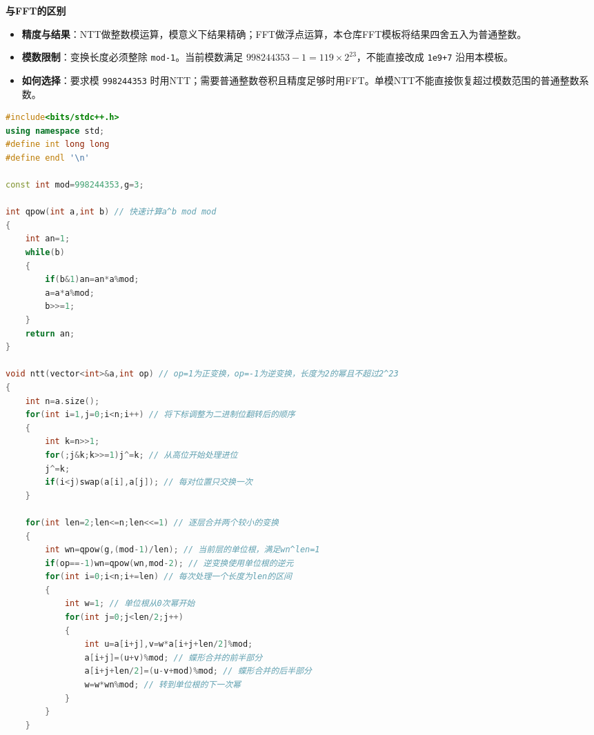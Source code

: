 \documentclass[10pt,landscape,a4paper]{article}
\begin{document}
\begin{multicols*}{3}
\par\addvspace{0.7ex}\noindent\textbf{与FFT的区别}\par\nobreak
\begin{itemize}
\item \textbf{精度与结果}：NTT做整数模运算，模意义下结果精确；FFT做浮点运算，本仓库FFT模板将结果四舍五入为普通整数。
\item \textbf{模数限制}：变换长度必须整除 \texttt{m\allowbreak{}o\allowbreak{}d\allowbreak{}-\allowbreak{}1}。当前模数满足 $998244353-1=119\times2^{23}$，不能直接改成 \texttt{1\allowbreak{}e\allowbreak{}9\allowbreak{}+\allowbreak{}7} 沿用本模板。
\item \textbf{如何选择}：要求模 \texttt{9\allowbreak{}9\allowbreak{}8\allowbreak{}2\allowbreak{}4\allowbreak{}4\allowbreak{}3\allowbreak{}5\allowbreak{}3} 时用NTT；需要普通整数卷积且精度足够时用FFT。单模NTT不能直接恢复超过模数范围的普通整数系数。
\end{itemize}
\par{}\par
\begin{lstlisting}[language=C++]
#include<bits/stdc++.h>
using namespace std;
#define int long long
#define endl '\n'

const int mod=998244353,g=3;

int qpow(int a,int b) // 快速计算a^b mod mod
{
    int an=1;
    while(b)
    {
        if(b&1)an=an*a%mod;
        a=a*a%mod;
        b>>=1;
    }
    return an;
}

void ntt(vector<int>&a,int op) // op=1为正变换，op=-1为逆变换，长度为2的幂且不超过2^23
{
    int n=a.size();
    for(int i=1,j=0;i<n;i++) // 将下标调整为二进制位翻转后的顺序
    {
        int k=n>>1;
        for(;j&k;k>>=1)j^=k; // 从高位开始处理进位
        j^=k;
        if(i<j)swap(a[i],a[j]); // 每对位置只交换一次
    }

    for(int len=2;len<=n;len<<=1) // 逐层合并两个较小的变换
    {
        int wn=qpow(g,(mod-1)/len); // 当前层的单位根，满足wn^len=1
        if(op==-1)wn=qpow(wn,mod-2); // 逆变换使用单位根的逆元
        for(int i=0;i<n;i+=len) // 每次处理一个长度为len的区间
        {
            int w=1; // 单位根从0次幂开始
            for(int j=0;j<len/2;j++)
            {
                int u=a[i+j],v=w*a[i+j+len/2]%mod;
                a[i+j]=(u+v)%mod; // 蝶形合并的前半部分
                a[i+j+len/2]=(u-v+mod)%mod; // 蝶形合并的后半部分
                w=w*wn%mod; // 转到单位根的下一次幂
            }
        }
    }


\end{lstlisting}
\end{multicols*}
\end{document}
